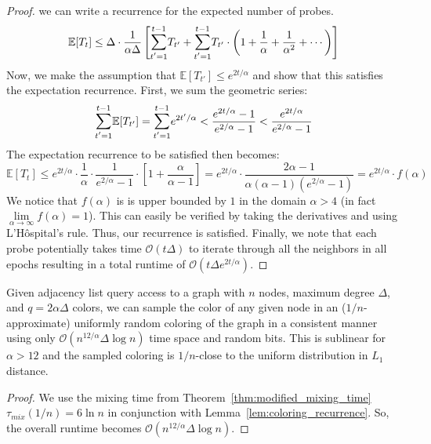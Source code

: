 \begin{proof}
we can write a recurrence for the expected number of probes.
\begin{align}
\mathbb E[T_t]\le \Delta\cdot\frac{1}{\alpha\Delta}
\left[
\mathlarger\sum\limits_{t'=1}^{t-1} T_{t'} + \mathlarger\sum\limits_{t'=1}^{t-1} T_{t'}\cdot
\left(1 + \frac1\alpha + \frac1{\alpha^2} + \cdots\right)
\right]
\end{align}
Now, we make the assumption that $\mathbb E[T_{t'}]\le e^{2t/\alpha}$ and show that this satisfies the expectation recurrence.
First, we sum the geometric series:
\[
\mathlarger\sum\limits_{t'=1}^{t-1} \mathbb E[T_{t'}] = \mathlarger\sum\limits_{t'=1}^{t-1} e^{2t'/\alpha}
< \frac{e^{2t/\alpha}-1}{e^{2/\alpha}-1} < \frac{e^{2t/\alpha}}{e^{2/\alpha}-1}
\]
The expectation recurrence to be satisfied then becomes:
\[
\mathbb E[T_t]\le e^{2t/\alpha}\cdot \frac 1{\alpha}\cdot \frac{1}{e^{2/\alpha}-1}\cdot \left[ 1+ \frac{\alpha}{\alpha-1} \right]
= e^{2t/\alpha}\cdot \frac{2\alpha-1}{\alpha(\alpha-1)(e^{2/\alpha}-1)} = e^{2t/\alpha}\cdot f(\alpha)
\]
We notice that $f(\alpha)$ is is upper bounded by $1$ in the domain $\alpha> 4$ (in fact $\lim\limits_{\alpha\to\infty}f(\alpha) = 1$).
This can easily be verified by taking the derivatives and using L'H\^{o}spital's rule.
Thus, our recurrence is satisfied.
Finally, we note that each probe potentially takes time $\mathcal O(t\Delta)$ to iterate through all the neighbors in all epochs
resulting in a total runtime of $\mathcal O(t\Delta e^{2t/\alpha})$.
\end{proof}


\begin{theorem}
\label{thm:coloring_generator_main}
Given adjacency list query access to a graph with $n$ nodes, maximum degree $\Delta$, and $q=2\alpha\Delta$ colors,
we can sample the color of any given node in an ($1/n$-approximate) uniformly random coloring of the graph in a consistent manner
using only $\mathcal O(n^{12/\alpha}\Delta\log n)$ time space and random bits.
This is sublinear for $\alpha>12$ and the sampled coloring is $1/n$-close to the uniform distribution in $L_1$ distance.
\end{theorem}
\begin{proof}
We use the mixing time from Theorem~\ref{thm:modified_mixing_time} $\tau_{mix}(1/n) = 6\ln n$ in conjunction with Lemma~\ref{lem:coloring_recurrence}.
So, the overall runtime becomes $\mathcal O(n^{12/\alpha}\Delta\log n)$.
\end{proof}

